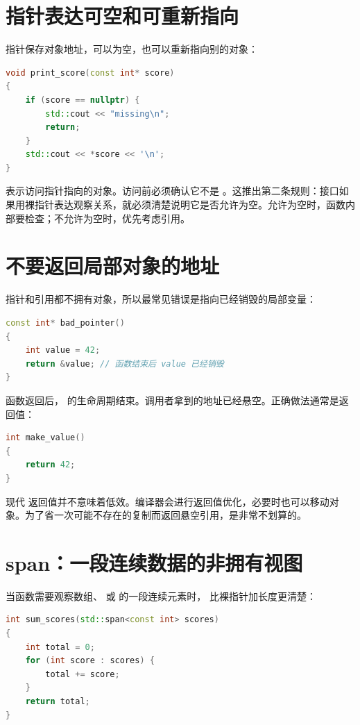 \section{指针表达可空和可重新指向}

指针保存对象地址，可以为空，也可以重新指向别的对象：

\begin{lstlisting}[language=C++,caption={指针可以表示可选对象}]
void print_score(const int* score)
{
    if (score == nullptr) {
        std::cout << "missing\n";
        return;
    }
    std::cout << *score << '\n';
}
\end{lstlisting}

 表示访问指针指向的对象。访问前必须确认它不是 。这推出第二条规则：接口如果用裸指针表达观察关系，就必须清楚说明它是否允许为空。允许为空时，函数内部要检查；不允许为空时，优先考虑引用。

\section{不要返回局部对象的地址}

指针和引用都不拥有对象，所以最常见错误是指向已经销毁的局部变量：

\begin{lstlisting}[language=C++,caption={返回局部变量地址是错误}]
const int* bad_pointer()
{
    int value = 42;
    return &value; // 函数结束后 value 已经销毁
}
\end{lstlisting}

函数返回后， 的生命周期结束。调用者拿到的地址已经悬空。正确做法通常是返回值：

\begin{lstlisting}[language=C++,caption={返回值让调用者拥有结果}]
int make_value()
{
    return 42;
}
\end{lstlisting}

现代 \cpp 返回值并不意味着低效。编译器会进行返回值优化，必要时也可以移动对象。为了省一次可能不存在的复制而返回悬空引用，是非常不划算的。

\section{span：一段连续数据的非拥有视图}

当函数需要观察数组、 或  的一段连续元素时， 比裸指针加长度更清楚：

\begin{lstlisting}[language=C++,caption={用 span 表达连续区间}]
int sum_scores(std::span<const int> scores)
{
    int total = 0;
    for (int score : scores) {
        total += score;
    }
    return total;
}
\end{lstlisting}

